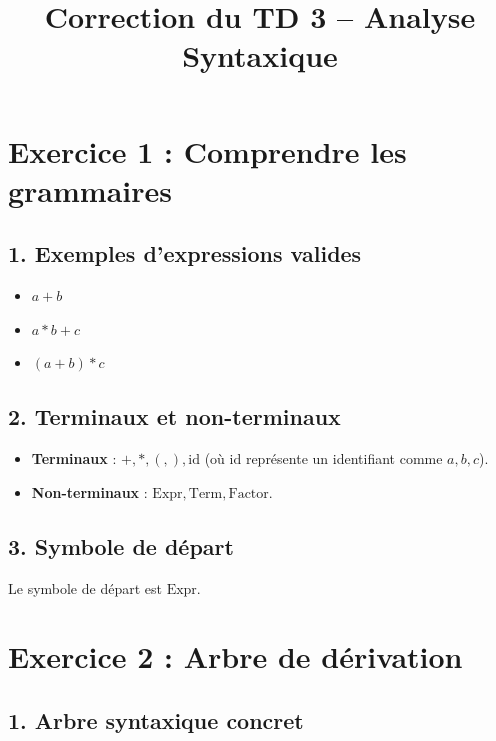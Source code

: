 \documentclass[12pt]{article}
\title{Correction du TD 3 – Analyse Syntaxique}
\author{}
\date{}
\begin{document}
\maketitle

\section*{Exercice 1 : Comprendre les grammaires}

\subsection*{1. Exemples d'expressions valides}
\begin{itemize}
    \item \(a + b\)
    \item \(a * b + c\)
    \item \((a + b) * c\)
\end{itemize}

\subsection*{2. Terminaux et non-terminaux}
\begin{itemize}
    \item \textbf{Terminaux} : \(+, *, (, ), \text{id}\) (où \(\text{id}\) représente un identifiant comme \(a, b, c\)).
    \item \textbf{Non-terminaux} : \(\text{Expr}, \text{Term}, \text{Factor}\).
\end{itemize}

\subsection*{3. Symbole de départ}
Le symbole de départ est \(\text{Expr}\).

\section*{Exercice 2 : Arbre de dérivation}

\subsection*{1. Arbre syntaxique concret}
\end{document}
